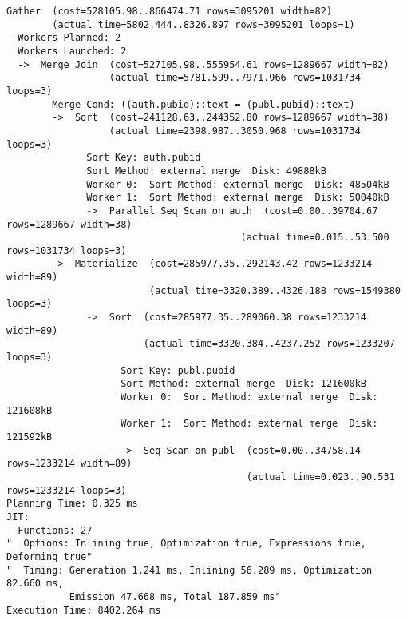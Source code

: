 \documentclass[11pt]{scrartcl}
\begin{document}
{\small
\parskip0pt\begin{verbatim}
Gather  (cost=528105.98..866474.71 rows=3095201 width=82)
        (actual time=5802.444..8326.897 rows=3095201 loops=1)
  Workers Planned: 2
  Workers Launched: 2
  ->  Merge Join  (cost=527105.98..555954.61 rows=1289667 width=82)
                  (actual time=5781.599..7971.966 rows=1031734 loops=3)
        Merge Cond: ((auth.pubid)::text = (publ.pubid)::text)
        ->  Sort  (cost=241128.63..244352.80 rows=1289667 width=38)
                  (actual time=2398.987..3050.968 rows=1031734 loops=3)
              Sort Key: auth.pubid
              Sort Method: external merge  Disk: 49888kB
              Worker 0:  Sort Method: external merge  Disk: 48504kB
              Worker 1:  Sort Method: external merge  Disk: 50040kB
              ->  Parallel Seq Scan on auth  (cost=0.00..39704.67 rows=1289667 width=38)
                                         (actual time=0.015..53.500 rows=1031734 loops=3)
        ->  Materialize  (cost=285977.35..292143.42 rows=1233214 width=89)
                         (actual time=3320.389..4326.188 rows=1549380 loops=3)
              ->  Sort  (cost=285977.35..289060.38 rows=1233214 width=89)
                        (actual time=3320.384..4237.252 rows=1233207 loops=3)
                    Sort Key: publ.pubid
                    Sort Method: external merge  Disk: 121600kB
                    Worker 0:  Sort Method: external merge  Disk: 121608kB
                    Worker 1:  Sort Method: external merge  Disk: 121592kB
                    ->  Seq Scan on publ  (cost=0.00..34758.14 rows=1233214 width=89)
                                          (actual time=0.023..90.531 rows=1233214 loops=3)
Planning Time: 0.325 ms
JIT:
  Functions: 27
"  Options: Inlining true, Optimization true, Expressions true, Deforming true"
"  Timing: Generation 1.241 ms, Inlining 56.289 ms, Optimization 82.660 ms,
           Emission 47.668 ms, Total 187.859 ms"
Execution Time: 8402.264 ms
\end{verbatim}}
\end{document}
